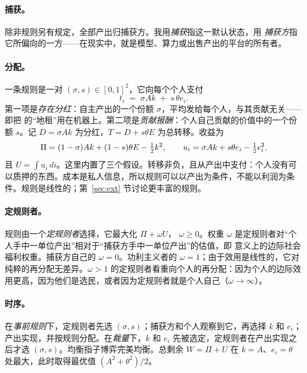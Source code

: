 \paragraph{捕获。} 除非规则另有规定，全部产出归捕获方。我用\emph{捕获}指这一默认状态，用
\emph{捕获方}指它所偏向的一方——在现实中，就是模型、算力或出售产出的平台的所有者。

\paragraph{分配。} 一条规则是一对 $(\sigma,s)\in[0,1]^2$，它向每个个人支付
\begin{equation}
  t_i \;=\; \sigma A k \;+\; s\,\theta e_i .
\end{equation}
第一项是\emph{存在分红}：自主产出的一个份额 $\sigma$，平均发给每个人，与其贡献无关——即把
\citet{Paine1797} 的“地租”用在机器上。第二项是\emph{贡献报酬}：个人自己贡献的价值中的一个份额 $s$。记 $D=\sigma A k$ 为分红，$T=D+s\theta E$ 为总转移。收益为
\begin{equation}
  \Pi=(1-\sigma)Ak+(1-s)\theta E-\tfrac{1}{2} k^2, \qquad
  u_i=\sigma Ak+s\theta e_i-\tfrac{1}{2} e_i^2 ,
\end{equation}
且 $U=\int u_i\,di$。这里内置了三个假设。转移非负，且从产出中支付：个人没有可以质押的东西。成本是私人信息，所以规则可以以产出为条件，不能以利润为条件。规则是线性的；第~\ref{sec:ext} 节讨论更丰富的规则。

\paragraph{定规则者。} 规则由一个\emph{定规则者}选择，它最大化 $\Pi+\omega U$，
$\omega\ge 0$。权重 $\omega$ 是定规则者对“个人手中一单位产出”相对于“捕获方手中一单位产出”的估值，即 \citet{SaezStantcheva2016} 意义上的边际社会福利权重。捕获方自己的 $\omega=0$。功利主义者的 $\omega=1$；由于效用是线性的，它对纯粹的再分配无差异。$\omega>1$ 的定规则者看重向个人的再分配：因为个人的边际效用更高，因为他们是选民，或者因为定规则者就是个人自己（$\omega\to\infty$）。

\paragraph{时序。} 在\emph{事前规则}下，定规则者先选 $(\sigma,s)$；捕获方和个人观察到它，再选择 $k$ 和 $e_i$；产出实现，并按规则分配。在\emph{裁量}下，$k$ 和 $e_i$ 先被选定，定规则者在产出实现之后才选 $(\sigma,s)$。均衡指子博弈完美均衡。总剩余 $W=\Pi+U$ 在
$k=A$、$e_i=\theta$ 处最大，此时取得最优值 $(A^2+\theta^2)/2$。

